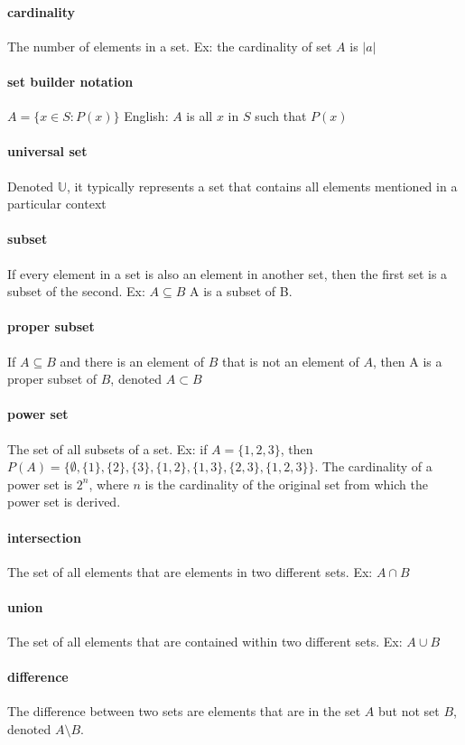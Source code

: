 \documentclass[a4paper]{article}
\begin{document}
\paragraph{cardinality} The number of elements in a set. Ex: the cardinality of set $A$ is $|a|$
\paragraph{set builder notation} $A = \{x \in S : P(x)\}$ English: $A$ is all $x$ in $S$ such that $P(x)$
\paragraph{universal set} Denoted $\mathbb U$, it typically represents a set that contains all elements mentioned in a particular context
\paragraph{subset} If every element in a set is also an element in another set, then the first set is a subset of the second. Ex: $A \subseteq B$ A is a subset of B.
\paragraph{proper subset} If $A \subseteq B$ and there is an element of $B$ that is not an element of $A$, then A is a proper subset of $B$, denoted $A \subset B$
\paragraph{power set} The set of all subsets of a set. Ex: if $A = \{1, 2, 3\}$, then $P(A) = \{\emptyset, \{ 1 \}, \{ 2 \}, \{ 3 \}, \{ 1, 2 \}, \{ 1, 3 \}, \{ 2, 3 \}, \{ 1, 2, 3 \} \} $. The cardinality of a power set is $2^n$, where $n$ is the cardinality of the original set from which the power set is derived.
\paragraph{intersection} The set of all elements that are elements in two different sets. Ex: $A \cap B$
\paragraph{union} The set of all elements that are contained within two different sets. Ex: $A \cup B$
\paragraph{difference} The difference between two sets are elements that are in the set $A$ but not set $B$, denoted $A \setminus B$.
\end{document}
